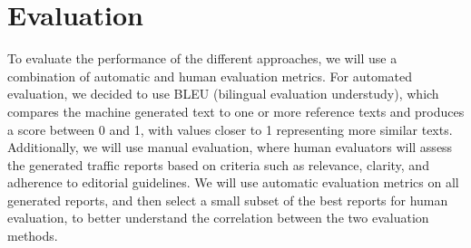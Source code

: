 \documentclass[fleqn,moreauthors,10pt]{ds_report}
\begin{document}
\section*{Evaluation}
To evaluate the performance of the different approaches, we will use a combination of automatic and human evaluation metrics.
For automated evaluation, we decided to use BLEU (bilingual evaluation understudy), which compares the machine generated text to one or more reference texts and produces a score between 0 and 1, with values closer to 1 representing more similar texts.
Additionally, we will use manual evaluation, where human evaluators will assess the generated traffic reports based on criteria such as relevance, clarity, and adherence to editorial guidelines.
We will use automatic evaluation metrics on all generated reports, and then select a small subset of the best reports for human evaluation, to better understand the correlation between the two evaluation methods.


\end{document}
